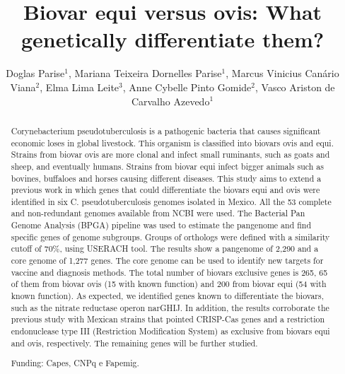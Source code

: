 \documentclass[twoside]{article}
\title{\vspace{-15mm}\fontsize{24pt}{10pt}\selectfont\textbf{Biovar equi versus ovis: What genetically differentiate them?}} %
\author{Doglas Parise$^1$, Mariana Teixeira Dornelles Parise$^1$, Marcus Vinicius Can\'ario Viana$^2$, Elma Lima Leite$^3$, Anne Cybelle Pinto Gomide$^2$, Vasco Ariston de Carvalho Azevedo$^1$}
\affil{1 UFMG\\ }
\date{}
\begin{document}
\maketitle %

\thispagestyle{fancy} %


\begin{abstract}
Corynebacterium pseudotuberculosis is a pathogenic bacteria that causes significant economic loses in global livestock. This organism is classified into biovars ovis and equi. Strains from biovar ovis are more clonal and infect small ruminants, such as goats and sheep, and eventually humans. Strains from biovar equi infect bigger animals such as bovines, buffaloes and horses causing different diseases. This study aims to extend a previous work in which genes that could differentiate the biovars equi and ovis were identified in six C. pseudotuberculosis genomes isolated in Mexico. All the 53 complete and non-redundant genomes available from NCBI were used. The Bacterial Pan Genome Analysis (BPGA) pipeline was used to estimate the pangenome and find specific genes of genome subgroups. Groups of orthologs were defined with a similarity cutoff of 70\%, using USERACH tool. The results show a pangenome of 2,290 and a core genome of 1,277 genes. The core genome can be used to identify new targets for vaccine and diagnosis methods. The total number of biovars exclusive genes is 265, 65 of them from biovar ovis (15 with known function) and 200 from biovar equi (54 with known function). As expected, we identified genes known to differentiate the biovars, such as the nitrate reductase operon narGHIJ. In addition, the results corroborate the previous study with Mexican strains that pointed CRISP-Cas genes and a restriction endonuclease type III (Restriction Modification System) as exclusive from biovars equi and ovis, respectively. The remaining genes will be further studied.

Funding: Capes, CNPq e Fapemig.
\end{abstract}
\end{document}
